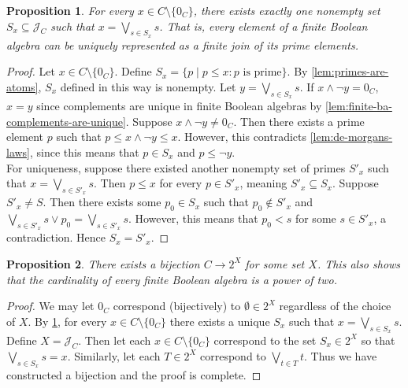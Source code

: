 \documentclass{article}
\newtheorem{proposition}{Proposition}[section]
\newcommand{\meet}{\wedge}
\newcommand{\join}{\vee}
\newcommand{\bigjoin}{\bigvee}
\begin{document}
\begin{proposition} \label{prop:repr-bool-alg-with-primes}
For every $x \in C \setminus \{0_C\}$, there exists exactly one nonempty set $S_x \subseteq \mathcal{J}_C$ such that $x = \bigjoin_{s \in S_x} s$. That is, every element of a finite Boolean algebra can be uniquely represented as a finite join of its prime elements.
\end{proposition}

\begin{proof}
Let $x \in C \setminus \{0_C\}$. Define $S_x = \{p \mid p \leq x : p \text{ is prime}\}$. By \cref{lem:primes-are-atoms}, $S_x$ defined in this way is nonempty. Let $y = \bigjoin_{s \in S_x} s$. If $x \meet \neg y = 0_C$, $x = y$ since complements are unique in finite Boolean algebras by \cref{lem:finite-ba-complements-are-unique}. Suppose $x \meet \neg y \neq 0_C$. Then there exists a prime element $p$ such that $p \leq x \meet \neg y \leq x$. However, this contradicts \cref{lem:de-morgans-laws}, since this means that $p \in S_x$ and $p \leq \neg y$. \\

For uniqueness, suppose there existed another nonempty set of primes $S'_x$ such that $x = \bigjoin_{s \in S'_x} s$. Then $p \leq x$ for every $p \in S'_x$, meaning $S'_x \subseteq S_x$. Suppose $S'_x \neq S$. Then there exists some $p_0 \in S_x$ such that $p_0 \not\in S'_x$ and $\bigjoin_{s \in S'_x} s \join p_0 = \bigjoin_{s \in S'_x} s$. However, this means that $p_0 < s$ for some $s \in S'_x$, a contradiction. Hence $S_x = S'_x$.
\end{proof}

\begin{proposition}
There exists a bijection $C \to 2^X$ for some set $X$. This also shows that the cardinality of every finite Boolean algebra is a power of two. 
\end{proposition}

\begin{proof}
We may let $0_C$ correspond (bijectively) to $\emptyset \in 2^X$ regardless of the choice of $X$. By \cref{prop:repr-bool-alg-with-primes}, for every $x \in C \setminus \{0_C\}$ there exists a unique $S_x$ such that $x = \bigjoin_{s \in S_x} s$. Define $X = \mathcal{J}_C$. Then let each $x \in C \setminus \{0_C\}$ correspond to the set $S_x \in 2^X$ so that $\bigjoin_{s \in S_x} s = x$. Similarly, let each $T \in 2^X$ correspond to $\bigjoin_{t \in T} t$. Thus we have constructed a bijection and the proof is complete.
\end{proof}
\end{document}
